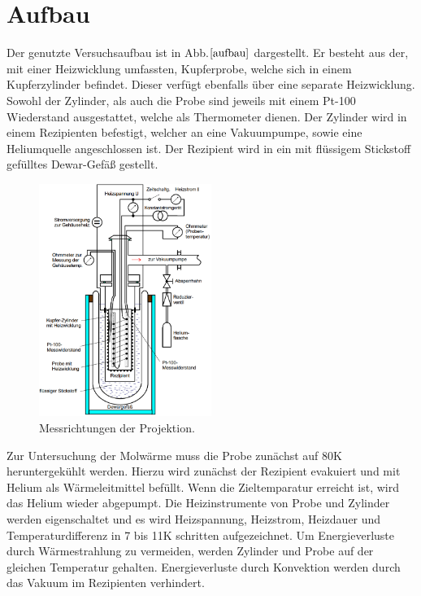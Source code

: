 \section{Aufbau}
Der genutzte Versuchsaufbau ist in Abb.$\ref{aufbau}$ dargestellt. Er besteht aus der, mit einer Heizwicklung umfassten, Kupferprobe, welche sich in einem Kupferzylinder befindet. Dieser verfügt ebenfalls über eine
separate Heizwicklung. Sowohl der Zylinder, als auch die Probe sind jeweils mit einem Pt-100 Wiederstand ausgestattet, welche als Thermometer dienen. Der Zylinder wird in einem Rezipienten befestigt, welcher an eine
Vakuumpumpe, sowie eine Heliumquelle angeschlossen ist. Der Rezipient wird in ein mit flüssigem Stickstoff gefülltes Dewar-Gefäß gestellt.

\begin{figure}[H]
  \centering
  \includegraphics[width=0.5\textwidth]{Bilder/aufbau.png}
  \caption{Messrichtungen der Projektion.}
  \label{aufbau}
\end{figure}

Zur Untersuchung der Molwärme muss die Probe zunächst auf 80K heruntergekühlt werden. Hierzu wird zunächst der Rezipient evakuiert und mit Helium als Wärmeleitmittel befüllt. Wenn die Zieltemparatur erreicht ist, wird das Helium wieder
abgepumpt. Die Heizinstrumente von Probe und Zylinder werden eigenschaltet und es wird Heizspannung, Heizstrom, Heizdauer und Temperaturdifferenz in 7 bis 11K schritten aufgezeichnet. Um Energieverluste durch
Wärmestrahlung zu vermeiden, werden Zylinder und Probe auf der gleichen Temperatur gehalten. Energieverluste durch Konvektion werden durch das Vakuum im Rezipienten verhindert.
